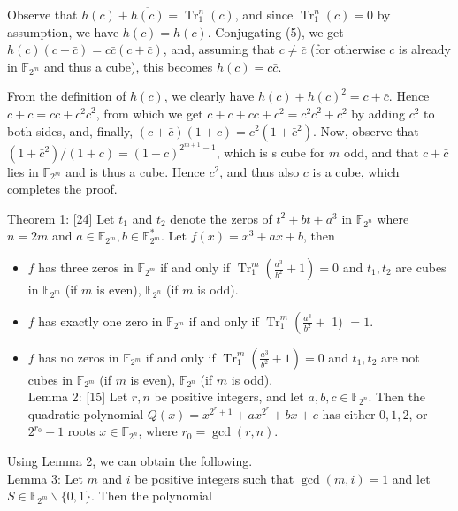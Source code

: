 \documentclass[10pt]{article}
\begin{document}
Observe that $h(c)+\overline{h(c)}=\operatorname{Tr}_{1}^{n}(c)$, and since $\operatorname{Tr}_{1}^{n}(c)=0$ by assumption, we have $h(c)=h(c)$. Conjugating (5), we get $h(c)(c+\bar{c})=c \bar{c}(c+\bar{c})$, and, assuming that $c \neq \bar{c}$ (for otherwise $c$ is already in $\mathbb{F}_{2^{m}}$ and thus a cube), this becomes $h(c)=c \bar{c}$.

From the definition of $h(c)$, we clearly have $h(c)+h(c)^{2}= c+\bar{c}$. Hence $c+\bar{c}=c \bar{c}+c^{2} \bar{c}^{2}$, from which we get $c+\bar{c}+ c \bar{c}+c^{2}=c^{2} \bar{c}^{2}+c^{2}$ by adding $c^{2}$ to both sides, and, finally, $(c+\bar{c})(1+c)=c^{2}\left(1+\bar{c}^{2}\right)$. Now, observe that $\left(1+\bar{c}^{2}\right) /(1+c)= (1+c)^{2^{m+1}-1}$, which is s cube for $m$ odd, and that $c+\bar{c}$ lies in $\mathbb{F}_{2^{m}}$ and is thus a cube. Hence $c^{2}$, and thus also $c$ is a cube, which completes the proof.

Theorem 1: [24] Let $t_{1}$ and $t_{2}$ denote the zeros of $t^{2}+ b t+a^{3}$ in $\mathbb{F}_{2^{n}}$ where $n=2 m$ and $a \in \mathbb{F}_{2^{m}}, b \in \mathbb{F}_{2^{m}}^{*}$. Let $f(x)=x^{3}+a x+b$, then

\begin{itemize}
  \item $f$ has three zeros in $\mathbb{F}_{2^{m}}$ if and only if $\operatorname{Tr}_{1}^{m}\left(\frac{a^{3}}{b^{2}}+1\right)=0$ and $t_{1}, t_{2}$ are cubes in $\mathbb{F}_{2^{m}}$ (if $m$ is even), $\mathbb{F}_{2^{n}}$ (if $m$ is odd).
  \item $f$ has exactly one zero in $\mathbb{F}_{2^{m}}$ if and only if $\operatorname{Tr}_{1}^{m}\left(\frac{a^{3}}{b^{2}}+\right.$ 1) $=1$.
  \item $f$ has no zeros in $\mathbb{F}_{2^{m}}$ if and only if $\operatorname{Tr}_{1}^{m}\left(\frac{a^{3}}{b^{2}}+1\right)=0$ and $t_{1}, t_{2}$ are not cubes in $\mathbb{F}_{2^{m}}$ (if $m$ is even), $\mathbb{F}_{2^{n}}$ (if $m$ is odd).\\[0pt]
Lemma 2: [15] Let $r, n$ be positive integers, and let $a, b, c \in \mathbb{F}_{2^{n}}$. Then the quadratic polynomial $Q(x)=x^{2^{r}+1}+ a x^{2^{r}}+b x+c$ has either $0,1,2$, or $2^{r_{0}}+1$ roots $x \in \mathbb{F}_{2^{n}}$, where $r_{0}=\operatorname{gcd}(r, n)$.
\end{itemize}

Using Lemma 2, we can obtain the following.\\
Lemma 3: Let $m$ and $i$ be positive integers such that $\operatorname{gcd}(m, i)=1$ and let $S \in \mathbb{F}_{2^{m}} \backslash\{0,1\}$. Then the polynomial
\end{document}
